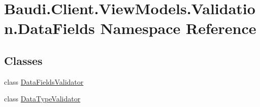\hypertarget{namespace_baudi_1_1_client_1_1_view_models_1_1_validation_1_1_data_fields}{}\section{Baudi.\+Client.\+View\+Models.\+Validation.\+Data\+Fields Namespace Reference}
\label{namespace_baudi_1_1_client_1_1_view_models_1_1_validation_1_1_data_fields}
\subsection*{Classes}
\begin{DoxyCompactItemize}
\item 
class \hyperlink{class_baudi_1_1_client_1_1_view_models_1_1_validation_1_1_data_fields_1_1_data_fields_validator}{Data\+Fields\+Validator}
\item 
class \hyperlink{class_baudi_1_1_client_1_1_view_models_1_1_validation_1_1_data_fields_1_1_data_type_validator}{Data\+Type\+Validator}
\end{DoxyCompactItemize}
